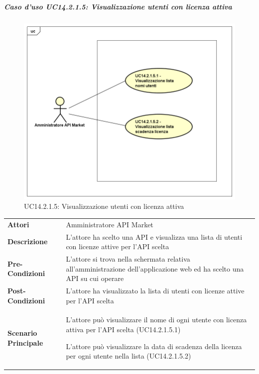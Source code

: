 \newpage
\subparagraph{Caso d'uso UC14.2.1.5: Visualizzazione utenti con licenza attiva}
\label{UC14_2_1_5}
\begin{figure}[ht]
	\centering
	\includegraphics[scale=0.45]{UML/UC14_2_1_5.png}
	\caption{UC14.2.1.5: Visualizzazione utenti con licenza attiva}
\end{figure}

\begin{minipage}{\linewidth}
	\begin{tabular}{ l | p{11cm}}
		\hline
		\rowcolor{Gray}
		\multicolumn{2}{c}{UC14.2.1.5 - Visualizzazione utenti con licenza attiva} \\
		\hline
		\textbf{Attori} & Amministratore API Market \\
		\textbf{Descrizione} & L'attore ha scelto una API e visualizza una lista di utenti con licenze attive per l'API scelta\\
		\textbf{Pre-Condizioni} & L'attore si trova nella schermata relativa all'amministrazione dell'applicazione web ed ha scelto una API su cui operare \\
		\textbf{Post-Condizioni} & L'attore ha visualizzato la lista di utenti con licenze attive per l'API scelta \\
		\textbf{Scenario Principale} & 
		\begin{enumerate*}[label=(\arabic*.),itemjoin={\newline}]
			\item L'attore può visualizzare il nome di ogni utente con licenza attiva per l'API scelta (UC14.2.1.5.1)
			\item L'attore può visualizzare la data di scadenza della licenza per ogni utente nella lista (UC14.2.1.5.2)
		\end{enumerate*}\\
	\end{tabular}
\end{minipage}

